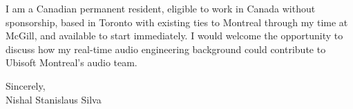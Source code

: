 \documentclass[11pt]{article}
\begin{document}
I am a Canadian permanent resident, eligible to work in Canada without sponsorship, based in Toronto with existing ties to Montreal through my time at McGill, and available to start immediately. I would welcome the opportunity to discuss how my real-time audio engineering background could contribute to Ubisoft Montreal's audio team.

Sincerely, \\
Nishal Stanislaus Silva
\end{document}

